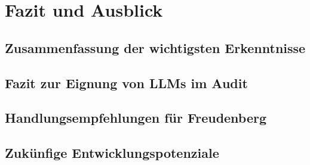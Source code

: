 \chapter{Fazit und Ausblick}

\section{Zusammenfassung der wichtigsten Erkenntnisse}

\section{Fazit zur Eignung von LLMs im Audit}

\section{Handlungsempfehlungen für Freudenberg}

\section{Zukünfige Entwicklungspotenziale}